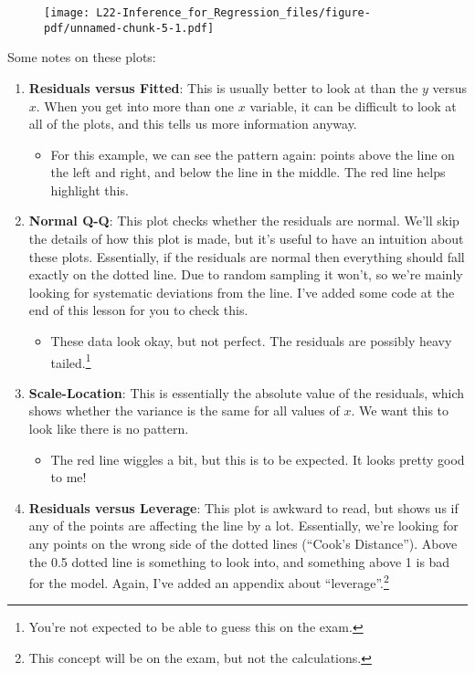 \documentclass[
  letterpaper,
  DIV=11,
  numbers=noendperiod]{scrreprt}
\providecommand{\tightlist}{%
  \setlength{\itemsep}{0pt}\setlength{\parskip}{0pt}}\usepackage{longtable,booktabs,array}
\begin{document}
\begin{figure}[H]

{\centering \texttt{[image: L22-Inference\_for\_Regression\_files/figure-pdf/unnamed-chunk-5-1.pdf]}

}

\end{figure}

Some notes on these plots:

\begin{enumerate}
\def\labelenumi{\arabic{enumi}.}
\tightlist
\item
  \textbf{Residuals versus Fitted}: This is usually better to look at
  than the \(y\) versus \(x\). When you get into more than one \(x\)
  variable, it can be difficult to look at all of the plots, and this
  tells us more information anyway.

  \begin{itemize}
  \tightlist
  \item
    For this example, we can see the pattern again: points above the
    line on the left and right, and below the line in the middle. The
    red line helps highlight this.
  \end{itemize}
\item
  \textbf{Normal Q-Q}: This plot checks whether the residuals are
  normal. We'll skip the details of how this plot is made, but it's
  useful to have an intuition about these plots. Essentially, if the
  residuals are normal then everything should fall exactly on the dotted
  line. Due to random sampling it won't, so we're mainly looking for
  systematic deviations from the line. I've added some code at the end
  of this lesson for you to check this.

  \begin{itemize}
  \tightlist
  \item
    These data look okay, but not perfect. The residuals are possibly
    heavy tailed.\footnote{You're not expected to be able to guess this
      on the exam.}
  \end{itemize}
\item
  \textbf{Scale-Location}: This is essentially the absolute value of the
  residuals, which shows whether the variance is the same for all values
  of \(x\). We want this to look like there is no pattern.

  \begin{itemize}
  \tightlist
  \item
    The red line wiggles a bit, but this is to be expected. It looks
    pretty good to me!
  \end{itemize}
\item
  \textbf{Residuals versus Leverage}: This plot is awkward to read, but
  shows us if any of the points are affecting the line by a lot.
  Essentially, we're looking for any points on the wrong side of the
  dotted lines (``Cook's Distance''). Above the 0.5 dotted line is
  something to look into, and something above 1 is bad for the model.
  Again, I've added an appendix about ``leverage''.\footnote{This
    concept will be on the exam, but not the calculations.}


\end{enumerate}
\end{document}
